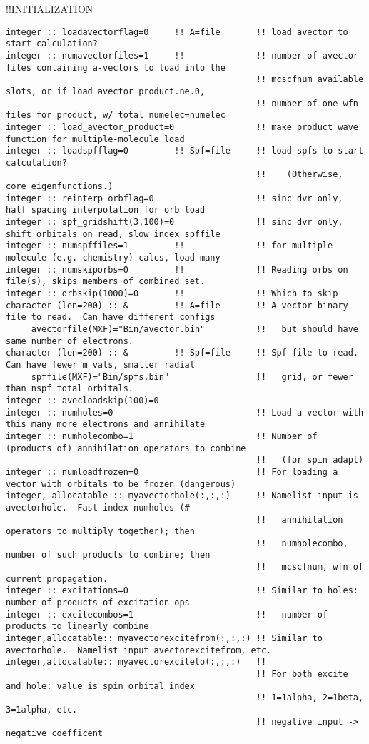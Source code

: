 !!{\large \quad INITIALIZATION}
\begin{verbatim}
integer :: loadavectorflag=0     !! A=file       !! load avector to start calculation?
integer :: numavectorfiles=1     !!              !! number of avector files containing a-vectors to load into the
                                                 !! mcscfnum available slots, or if load_avector_product.ne.0,
                                                 !! number of one-wfn files for product, w/ total numelec=numelec
integer :: load_avector_product=0                !! make product wave function for multiple-molecule load
integer :: loadspfflag=0         !! Spf=file     !! load spfs to start calculation?  
                                                 !!    (Otherwise, core eigenfunctions.)
integer :: reinterp_orbflag=0                    !! sinc dvr only, half spacing interpolation for orb load
integer :: spf_gridshift(3,100)=0                !! sinc dvr only, shift orbitals on read, slow index spffile
integer :: numspffiles=1         !!              !! for multiple-molecule (e.g. chemistry) calcs, load many
integer :: numskiporbs=0         !!              !! Reading orbs on file(s), skips members of combined set.
integer :: orbskip(1000)=0       !!              !! Which to skip
character (len=200) :: &         !! A=file       !! A-vector binary file to read.  Can have different configs
     avectorfile(MXF)="Bin/avector.bin"          !!   but should have same number of electrons.   
character (len=200) :: &         !! Spf=file     !! Spf file to read.  Can have fewer m vals, smaller radial 
     spffile(MXF)="Bin/spfs.bin"                 !!   grid, or fewer than nspf total orbitals. 
integer :: avecloadskip(100)=0
integer :: numholes=0                            !! Load a-vector with this many more electrons and annihilate
integer :: numholecombo=1                        !! Number of (products of) annihilation operators to combine 
                                                 !!   (for spin adapt)
integer :: numloadfrozen=0                       !! For loading a vector with orbitals to be frozen (dangerous)
integer, allocatable :: myavectorhole(:,:,:)     !! Namelist input is avectorhole.  Fast index numholes (#
                                                 !!   annihilation operators to multiply together); then    
                                                 !!   numholecombo, number of such products to combine; then
                                                 !!   mcscfnum, wfn of current propagation.
integer :: excitations=0                         !! Similar to holes: number of products of excitation ops
integer :: excitecombos=1                        !!   number of products to linearly combine
integer,allocatable:: myavectorexcitefrom(:,:,:) !! Similar to avectorhole.  Namelist input avectorexcitefrom, etc.
integer,allocatable:: myavectorexciteto(:,:,:)   !!
                                                 !! For both excite and hole: value is spin orbital index
                                                 !! 1=1alpha, 2=1beta, 3=1alpha, etc.
                                                 !! negative input -> negative coefficent
\end{verbatim}

